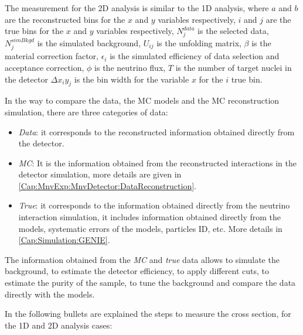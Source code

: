 The measurement for the 2D analysis is similar to the 1D analysis, where $a$ and $b$ are the reconstructed bins for the $x$ and $y$ variables respectively, $i$ and $j$ are the true bins for the $x$ and $y$ variables respectively, $N_j^{data}$ is the selected data, $N_j^{sim Bkgd}$ is the simulated background, $U_{ij}$ is the unfolding matrix, $\beta$ is the material correction factor, $\epsilon_i$ is the simulated efficiency of data selection and acceptance correction, $\phi$ is the neutrino flux, $T$ is the number of target nuclei in the detector $\Delta x_i y_j$ is the bin width for the variable $x$ for the $i$ true bin.

In the way to compare the data, the MC models and the MC reconstruction simulation, there are three categories of data:
\begin{itemize}
    \item \textit{Data}: it corresponds to the reconstructed information obtained directly from the detector.
    \item \textit{MC}: It is the information obtained from the reconstructed interactions in the detector simulation, more details are given in \ref{Cap:MnvExp:MnvDetector:DataReconstruction}. 
    \item \textit{True}: it corresponds to the information obtained directly from the neutrino interaction simulation, it includes information obtained directly from the models, systematic errors of the models, particles ID, etc. More details in \ref{Cap:Simulation:GENIE}.
\end{itemize}

The information obtained from the \textit{MC} and \textit{true} data allows to simulate the background, to estimate the detector efficiency, to apply different cuts, to estimate the purity of the sample, to tune the background and compare the data directly with the models. 

In the following bullets are explained the steps to measure the cross section, for the 1D and 2D analysis cases:

